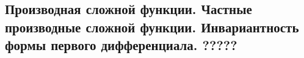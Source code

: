{
\subsection{Производная сложной функции. Частные производные сложной функции. Инвариантность формы первого дифференциала. ?????}
}